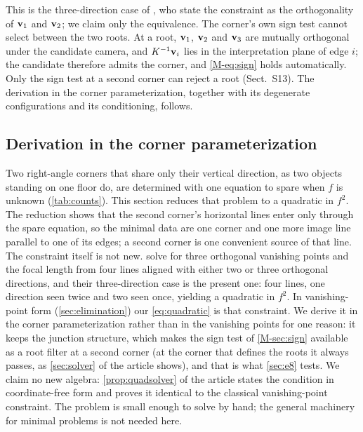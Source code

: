 This is the three-direction case of \citet{wildenauer2012}, who state the constraint as the orthogonality of $\mathbf{v}_1$ and $\mathbf{v}_2$; we claim only the equivalence. The corner's own sign test cannot select between the two roots. At a root, $\mathbf{v}_1$, $\mathbf{v}_2$ and $\mathbf{v}_3$ are mutually orthogonal under the candidate camera, and $K^{-1}\mathbf{v}_i$ lies in the interpretation plane of edge $i$; the candidate therefore admits the corner, and \eqref{M-eq:sign} holds automatically. Only the sign test at a second corner can reject a root (Sect.~S13). The derivation in the corner parameterization, together with its degenerate configurations and its conditioning, follows.

\subsection{Derivation in the corner parameterization}\label{sec:Ssolver}

Two right-angle corners that share only their vertical direction, as two objects standing on one floor do, are determined with one equation to spare when $f$ is unknown (\cref{tab:counts}). This section reduces that problem to a quadratic in $f^2$. The reduction shows that the second corner's horizontal lines enter only through the spare equation, so the minimal data are one corner and one more image line parallel to one of its edges; a second corner is one convenient source of that line. The constraint itself is not new. \citet{wildenauer2012} solve for three orthogonal vanishing points and the focal length from four lines aligned with either two or three orthogonal directions, and their three-direction case is the present one: four lines, one direction seen twice and two seen once, yielding a quadratic in $f^2$. In vanishing-point form (\cref{sec:elimination}) our \eqref{eq:quadratic} is that constraint. We derive it in the corner parameterization rather than in the vanishing points for one reason: it keeps the junction structure, which makes the sign test of \cref{M-sec:sign} available as a root filter at a second corner (at the corner that defines the roots it always passes, as \cref{sec:solver} of the article shows), and that is what \cref{sec:e8} tests. We claim no new algebra: \cref{prop:quadsolver} of the article states the condition in coordinate-free form and proves it identical to the classical vanishing-point constraint. The problem is small enough to solve by hand; the general machinery for minimal problems \citep{kukelova2008,larsson2017} is not needed here.

